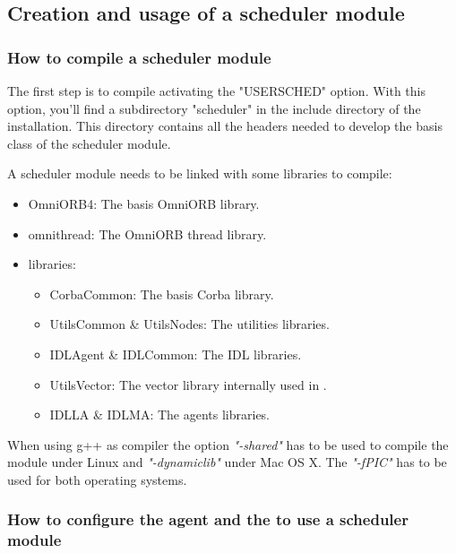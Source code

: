 \subsection{Creation and usage of a scheduler module}
\subsubsection{How to compile a scheduler module}
The first step is to compile \diet activating the "USERSCHED" option.
With this option, you'll find a subdirectory "scheduler" in the include
directory of the \diet installation. This directory contains all the headers
needed to develop the basis class of the scheduler module.

A scheduler module needs to be linked with some libraries to compile:
\begin{itemize}
  \item OmniORB4: The basis OmniORB library.
  \item omnithread: The OmniORB thread library.
  \item \diet libraries:
    \begin{itemize}
      \item CorbaCommon: The basis \diet Corba library.
      \item UtilsCommon \& UtilsNodes: The \diet utilities libraries.
      \item IDLAgent \& IDLCommon: The IDL \diet libraries.
      \item UtilsVector: The vector library internally used in \diet.
      \item IDLLA \& IDLMA: The agents libraries.
    \end{itemize}
\end{itemize}
When using g++ as compiler the option \textit{"-shared"} has to be used to
compile the module under Linux and \textit{"-dynamiclib"} under Mac OS X.
The \textit{"-fPIC"} has to be used for both operating systems.

\subsubsection{How to configure the agent and the {\sed} to use a
  scheduler module}

